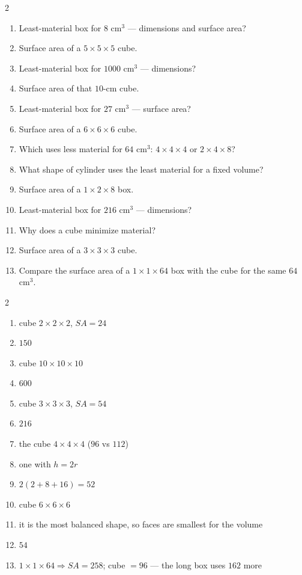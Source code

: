 \documentclass[11pt]{article}
\begin{document}
\begin{recapbox}
\begin{multicols}{2}
\small
\begin{enumerate}[leftmargin=*,itemsep=3pt]
  \item Least-material box for $8$ cm$^3$ — dimensions and surface area?
  \item Surface area of a $5\times5\times5$ cube.
  \item Least-material box for $1000$ cm$^3$ — dimensions?
  \item Surface area of that $10$-cm cube.
  \item Least-material box for $27$ cm$^3$ — surface area?
  \item Surface area of a $6\times6\times6$ cube.
  \item Which uses less material for $64$ cm$^3$: $4\times4\times4$ or $2\times4\times8$?
  \item What shape of cylinder uses the least material for a fixed volume?
  \item Surface area of a $1\times2\times8$ box.
  \item Least-material box for $216$ cm$^3$ — dimensions?
  \item Why does a cube minimize material?
  \item Surface area of a $3\times3\times3$ cube.
  \item Compare the surface area of a $1\times1\times64$ box with the cube for the same $64$ cm$^3$.
\end{enumerate}
\end{multicols}
\end{recapbox}

\begin{keybox}
\begin{multicols}{2}
\small
\begin{enumerate}[leftmargin=*,itemsep=3pt]
  \item cube $2\times2\times2$, $SA=24$
  \item $150$
  \item cube $10\times10\times10$
  \item $600$
  \item cube $3\times3\times3$, $SA=54$
  \item $216$
  \item the cube $4\times4\times4$ ($96$ vs $112$)
  \item one with $h=2r$
  \item $2(2+8+16)=52$
  \item cube $6\times6\times6$
  \item it is the most balanced shape, so faces are smallest for the volume
  \item $54$
  \item $1\times1\times64\Rightarrow SA=258$; cube $=96$ — the long box uses $162$ more
\end{enumerate}
\end{multicols}
\end{keybox}
\end{document}
